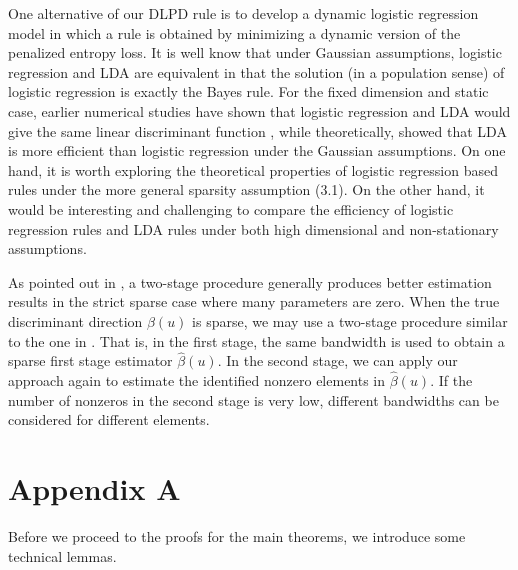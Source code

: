 \documentclass[11pt]{article}
\theoremstyle{definition}
\begin{document}
 One alternative of our DLPD rule is to develop a dynamic logistic regression model in which a rule is obtained by minimizing a dynamic version of the penalized entropy loss. It is well know that under Gaussian assumptions, logistic regression and LDA are equivalent in that the solution (in a population sense) of logistic regression is exactly the Bayes rule. For the fixed dimension and static case, earlier numerical studies have shown that logistic regression and LDA would give the same linear discriminant function \citep{Press}, while theoretically, \cite{efron1975} showed that LDA is more efficient than logistic regression under the Gaussian assumptions. On one hand, it is worth exploring the theoretical properties of logistic regression based rules under the more general sparsity assumption (3.1). On the other hand, it would be interesting and challenging to compare the efficiency of logistic regression rules and LDA rules under both high dimensional and non-stationary assumptions.
 
 As pointed out in \cite{candes}, a two-stage procedure generally produces better estimation results in the strict sparse case where many parameters are zero. When the true discriminant direction $\beta(u)$ is sparse, we may use a two-stage procedure similar to the one in \cite{spl}. That is, in the first stage, the same bandwidth is used to obtain a sparse first stage estimator $\hat{\beta}(u)$. In the second stage, we can apply our approach again to estimate the identified nonzero elements in $\hat{\beta}(u)$. If the number of nonzeros in the second stage is very low, different bandwidths can be considered for different elements.  
 
 \appendix
 
 \section*{Appendix A} 
 
 
 Before we proceed to the proofs for the main theorems, we introduce some technical lemmas. 
 
 
 
\end{document}
